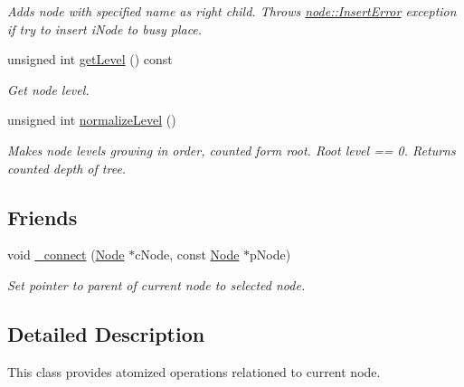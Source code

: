\begin{DoxyCompactItemize}
\begin{DoxyCompactList}\small\item\em Adds node with specified name as right child. Throws \hyperlink{classnode_1_1InsertError}{node\-::\-Insert\-Error} exception if try to insert i\-Node to busy place. \end{DoxyCompactList}\item 
\hypertarget{classnode_1_1Node_a1d1940dc3b8285207c7746bcf9569926}{unsigned int \hyperlink{classnode_1_1Node_a1d1940dc3b8285207c7746bcf9569926}{get\-Level} () const }\label{classnode_1_1Node_a1d1940dc3b8285207c7746bcf9569926}

\begin{DoxyCompactList}\small\item\em Get node level. \end{DoxyCompactList}\item 
\hypertarget{classnode_1_1Node_a7b5de538f317d34fbcd050ee22e1d6af}{unsigned int \hyperlink{classnode_1_1Node_a7b5de538f317d34fbcd050ee22e1d6af}{normalize\-Level} ()}\label{classnode_1_1Node_a7b5de538f317d34fbcd050ee22e1d6af}

\begin{DoxyCompactList}\small\item\em Makes node levels growing in order, counted form root. Root level == 0. Returns counted depth of tree. \end{DoxyCompactList}\end{DoxyCompactItemize}
\subsection*{Friends}
\begin{DoxyCompactItemize}
\item 
void \hyperlink{classnode_1_1Node_a64879d4c1aca07f9dd96e28e5bf988a4}{\-\_\-connect} (\hyperlink{classnode_1_1Node}{Node} $\ast$c\-Node, const \hyperlink{classnode_1_1Node}{Node} $\ast$p\-Node)
\begin{DoxyCompactList}\small\item\em Set pointer to parent of current node to selected node. \end{DoxyCompactList}\end{DoxyCompactItemize}


\subsection{Detailed Description}
This class provides atomized operations relationed to current node. 

